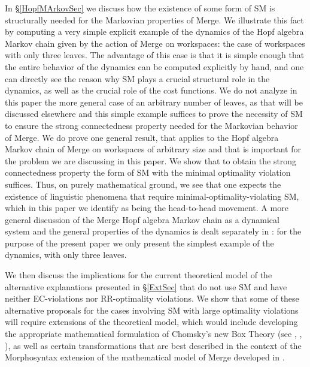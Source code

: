 \documentclass[12pt]{amsart}
\numberwithin{equation}{section}
\begin{document}
\smallskip

In \S \ref{HopfMArkovSec}
we discuss how the existence of some form of SM is structurally
needed for the Markovian properties of Merge. We illustrate this
fact by computing a very simple explicit example of the dynamics
of the Hopf algebra Markov chain given by the action of
Merge on workspaces: the case of workspaces with only three leaves.
The advantage of this case is that it is simple enough that the
entire behavior of the dynamics can be computed explicitly by hand,
and one can directly see the reason why SM plays a crucial structural
role in the dynamics, as well as the crucial role of the cost functions.
We do not analyze in this paper the more general case of an arbitrary
number of leaves, as that will be discussed elsewhere and this
simple example suffices to prove the necessity of SM to ensure
the strong connectedness property needed for the Markovian behavior of Merge. 
We do prove one general result, that applies to the Hopf algebra Markov chain
of Merge on workspaces of arbitrary size and that is important for
the problem we are discussing in this paper. We show that to obtain the
strong connectedness property the form of SM with the minimal optimality
violation suffices. Thus, on purely mathematical ground, we see that
one expects the existence of linguistic phenomena that require
minimal-optimality-violating SM, which in this paper we identify as
being the head-to-head movement. A more general discussion of
the Merge Hopf algebra Markov chain as a dynamical system and
the general properties of the dynamics is dealt separately in \cite{MarSkig}:
for the purpose of the present paper we only present the simplest
example of the dynamics, with only three leaves.

\smallskip

We then discuss the implications for the current theoretical
model of the alternative  explanations presented in \S \ref{ExtSec} 
that do not use SM and have neither EC-violations nor RR-optimality
violations. We show that some of these alternative proposals for the 
cases involving SM with large optimality violations will require extensions 
of the theoretical model, which would include developing the appropriate 
mathematical formulation of Chomsky's new Box Theory 
(see \cite{ChomskyKeio},  \cite{Chomsky23a}, \cite{Chomsky23b}),
as well as certain transformations that are best described in the
context of the Morphosyntax extension of the mathematical model
of Merge developed in \cite{SentMar}.

\smallskip
\end{document}
